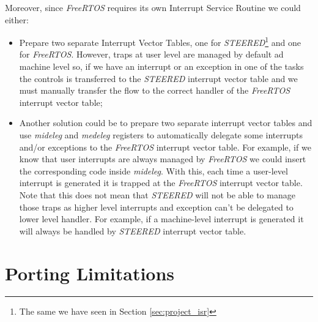 Moreover, since \textit{FreeRTOS} requires its own Interrupt Service Routine we could
either:
\begin{itemize}
  \item Prepare two separate Interrupt Vector Tables, one for \textit{STEERED}\footnote{The
    same we have seen in Section \ref{sec:project_isr}} and one for \textit{FreeRTOS}.
    However, traps at user level are managed by default ad machine level so, if
    we have an interrupt or an exception in one of the tasks the controls is
    transferred to the \textit{STEERED} interrupt vector table and we must manually
    transfer the flow to the correct handler of the \textit{FreeRTOS} interrupt
    vector table;

  \item Another solution could be to prepare two separate interrupt vector tables
    and use \textit{mideleg} and \textit{medeleg} registers to automatically delegate
    some interrupts and/or exceptions to the \textit{FreeRTOS} interrupt vector
    table. For example, if we know that user interrupts are always managed by
    \textit{FreeRTOS} we could insert the corresponding code inside \textit{mideleg}.
    With this, each time a user-level interrupt is generated it is trapped at
    the \textit{FreeRTOS} interrupt vector table. Note that this does not mean
    that \textit{STEERED} will not be able to manage those traps as higher level
    interrupts and exception can't be delegated to lower level handler. For
    example, if a machine-level interrupt is generated it will always be handled
    by \textit{STEERED} interrupt vector table.
\end{itemize}

\section{Porting Limitations}
\label{sec:rtos_limitations}